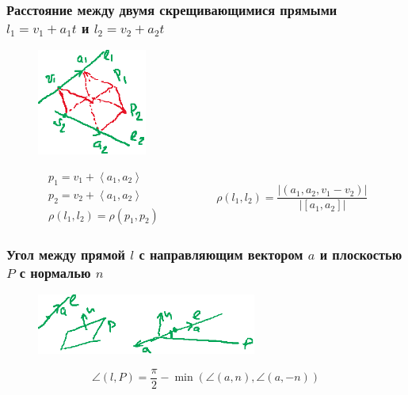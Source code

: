 \subsubsection{Расстояние между двумя скрещивающимися прямыми $l_1 = v_1 + a_1 t$ и $l_2 = v_2 + a_2 t$}

{
\begin{figure}
    \vspace{-10pt}
    \includegraphics[height=3.5cm]{lecture27_drawing_3}
\end{figure}

\begin{equation*}
    \begin{gathered}
        p_1 = v_1 + \left< a_1, a_2 \right> \\
        p_2 = v_2 + \left< a_1, a_2 \right> \\
        \rho(l_1, l_2) = \rho(p_1, p_2)
    \end{gathered}
    \hspace{2cm}
    \rho(l_1, l_2) = \frac{\left|(a_1, a_2, v_1 - v_2)\right|}{\left|[a_1, a_2]\right|}
\end{equation*}
\vspace{1.5cm}
}


\subsubsection{Угол между прямой $l$ с направляющим вектором $a$ и плоскостью $P$ с нормалью $n$}

{
\begin{figure}
    \vspace{-10pt}
    \includegraphics[height=2cm]{lecture27_drawing_4}
\end{figure}

\begin{equation*}
    \angle(l, P) = \frac{\pi}{2} - \min\left(\angle(a, n), \angle(a, -n)\right)
\end{equation*}
\vspace{0.5cm}
}


